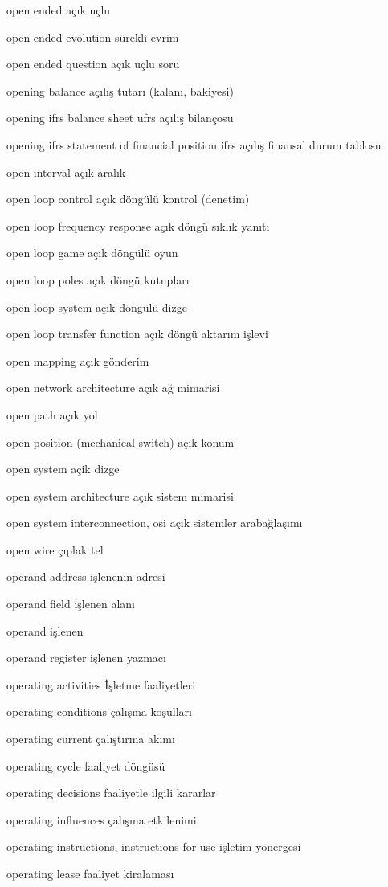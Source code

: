 \documentclass[12pt,fleqn]{article}\usepackage{../../common}
\begin{document}
open ended açık uçlu

open ended evolution sürekli evrim

open ended question açık uçlu soru

opening balance açılış tutarı (kalanı, bakiyesi)

opening ifrs balance sheet ufrs açılış bilançosu

opening ifrs statement of financial position ifrs açılış finansal durum tablosu

open interval açık aralık

open loop control açık döngülü kontrol (denetim)

open loop frequency response açık döngü sıklık yanıtı

open loop game açık döngülü oyun

open loop poles açık döngü kutupları

open loop system açık döngülü dizge

open loop transfer function açık döngü aktarım işlevi

open mapping açık gönderim

open network architecture açık ağ mimarisi

open path açık yol

open position (mechanical switch) açık konum

open system açik dizge

open system architecture açık sistem mimarisi

open system interconnection, osi açık sistemler arabağlaşımı

open wire çıplak tel

operand address işlenenin adresi

operand field işlenen alanı

operand işlenen

operand register işlenen yazmacı

operating activities İşletme faaliyetleri

operating conditions çalışma koşulları

operating current çalıştırma akımı

operating cycle faaliyet döngüsü

operating decisions faaliyetle ilgili kararlar

operating influences çalışma etkilenimi

operating instructions, instructions for use işletim yönergesi

operating lease faaliyet kiralaması
\end{document}

